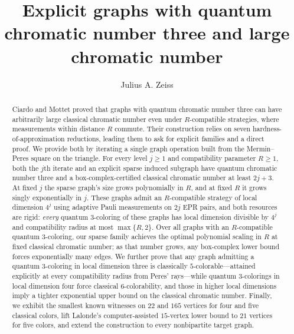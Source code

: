 \documentclass[a4paper,onecolumn,11pt,unpublished]{quantumarticle}
\title{Explicit graphs with quantum chromatic number three and large chromatic number}
\author{Julius A. Zeiss}
\affiliation{Institute for Quantum Information, RWTH Aachen University, Otto-Blumenthal-Stra\ss e 20, 52074 Aachen, Germany}
\theoremstyle{definition}
\begin{document}
\maketitle

\begin{abstract}
Ciardo and Mottet proved that graphs with quantum chromatic number three can have arbitrarily large classical chromatic number even under $R$-compatible strategies, where measurements within distance $R$ commute. Their construction relies on seven hardness-of-approximation reductions, leading them to ask for explicit families and a direct proof. We provide both by iterating a single graph operation built from the Mermin--Peres square on the triangle. For every level $j\ge1$ and compatibility parameter $R\ge1$, both the $j$th iterate and an explicit sparse induced subgraph have quantum chromatic number three and a box-complex-certified classical chromatic number at least $2j+3$. At fixed $j$ the sparse graph's size grows polynomially in $R$, and at fixed $R$ it grows singly exponentially in $j$. These graphs admit an $R$-compatible strategy of local dimension $4^j$ using adaptive Pauli measurements on $2j$ EPR pairs, and both resources are rigid: \emph{every} quantum $3$-coloring of these graphs has local dimension divisible by $4^j$ and compatibility radius at most $\max\{R,2\}$. Over all graphs with an $R$-compatible quantum $3$-coloring, our sparse family achieves the optimal polynomial scaling in $R$ at fixed classical chromatic number; as that number grows, any box-complex lower bound forces exponentially many edges. We further prove that any graph admitting a quantum $3$-coloring in local dimension three is classically $5$-colorable---attained explicitly at every compatibility radius from Peres' rays---while quantum $3$-colorings in local dimension four force classical $6$-colorability, and those in higher local dimensions imply a tighter exponential upper bound on the classical chromatic number. Finally, we exhibit the smallest known witnesses on $22$ and $165$ vertices for four and five classical colors, lift Lalonde's computer-assisted $15$-vertex lower bound to $21$ vertices for five colors, and extend the construction to every nonbipartite target graph.
\end{abstract}









\end{document}
